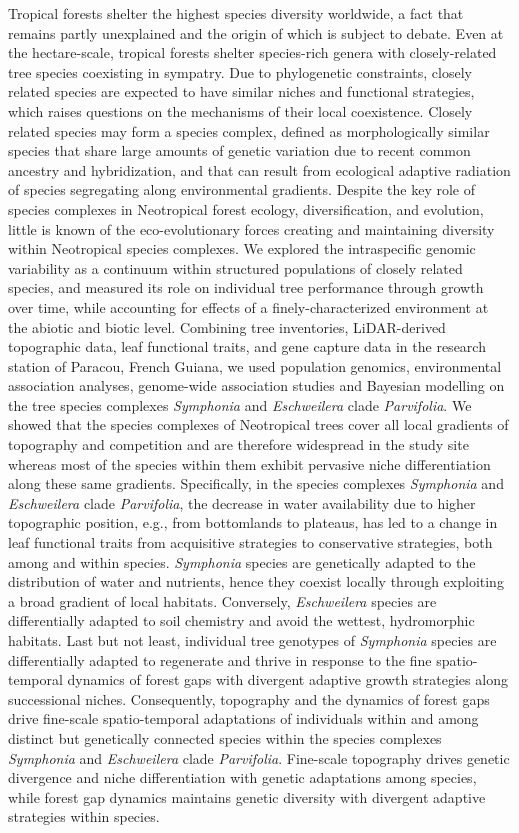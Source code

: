 {Tropical forests shelter the highest species diversity worldwide, a fact that remains partly unexplained and the origin of which is subject to debate. Even at the hectare-scale, tropical forests shelter species-rich genera with closely-related tree species coexisting in sympatry. Due to phylogenetic constraints, closely related species are expected to have similar niches and functional strategies, which raises questions on the mechanisms of their local coexistence. Closely related species may form a species complex, defined as morphologically similar species that share large amounts of genetic variation due to recent common ancestry and hybridization, and that can result from ecological adaptive radiation of species segregating along environmental gradients. Despite the key role of species complexes in Neotropical forest ecology, diversification, and evolution, little is known of the eco-evolutionary forces creating and maintaining diversity within Neotropical species complexes. We explored the intraspecific genomic variability as a continuum within structured populations of closely related species, and measured its role on individual tree performance through growth over time, while accounting for effects of a finely-characterized environment at the abiotic and biotic level. Combining tree inventories, LiDAR-derived topographic data, leaf functional traits, and gene capture data in the research station of Paracou, French Guiana, we used population genomics, environmental association analyses, genome-wide association studies and Bayesian modelling on the tree species complexes \emph{Symphonia} and \emph{Eschweilera} clade \emph{Parvifolia}. We showed that the species complexes of Neotropical trees cover all local gradients of topography and competition and are therefore widespread in the study site whereas most of the species within them exhibit pervasive niche differentiation along these same gradients. Specifically, in the species complexes \emph{Symphonia} and \emph{Eschweilera} clade \emph{Parvifolia}, the decrease in water availability due to higher topographic position, e.g., from bottomlands to plateaus, has led to a change in leaf functional traits from acquisitive strategies to conservative strategies, both among and within species. \emph{Symphonia} species are genetically adapted to the distribution of water and nutrients, hence they coexist locally through exploiting a broad gradient of local habitats. Conversely, \emph{Eschweilera} species are differentially adapted to soil chemistry and avoid the wettest, hydromorphic habitats. Last but not least, individual tree genotypes of \emph{Symphonia} species are differentially adapted to regenerate and thrive in response to the fine spatio-temporal dynamics of forest gaps with divergent adaptive growth strategies along successional niches. Consequently, topography and the dynamics of forest gaps drive fine-scale spatio-temporal adaptations of individuals within and among distinct but genetically connected species within the species complexes \emph{Symphonia} and \emph{Eschweilera} clade \emph{Parvifolia}. Fine-scale topography drives genetic divergence and niche differentiation with genetic adaptations among species, while forest gap dynamics maintains genetic diversity with divergent adaptive strategies within species. }
